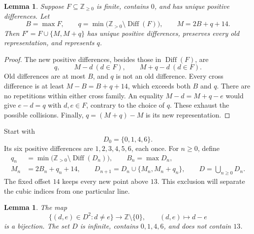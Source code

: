 \documentclass[11pt]{article}
\newtheorem{lemma}[theorem]{Lemma}
\theoremstyle{remark}
\newcommand{\Z}{\mathbb Z}
\DeclareMathOperator{\Diff}{Diff}
\begin{document}
\begin{lemma}\label{lem:extension}
Suppose $F\subseteq\Z_{\ge0}$ is finite, contains $0$, and has unique
positive differences. Let
\[
 B=\max F,\qquad
 q=\min\bigl(\Z_{>0}\setminus\Diff(F)\bigr),\qquad
 M=2B+q+14.
\]
Then $F'=F\cup\{M,M+q\}$ has unique positive differences, preserves
every old representation, and represents $q$.
\end{lemma}

\begin{proof}
The new positive differences, besides those in $\Diff(F)$, are
\[
 q,\qquad M-d\ (d\in F),\qquad M+q-d\ (d\in F).
\]
Old differences are at most $B$, and $q$ is not an old difference.
Every cross difference is at least
$M-B=B+q+14$, which exceeds both $B$ and $q$.
There are no repetitions within either cross family. An equality
$M-d=M+q-e$ would give $e-d=q$ with $d,e\in F$, contrary to the
choice of $q$. These exhaust the possible collisions. Finally,
$q=(M+q)-M$ is its new representation.
\end{proof}

Start with
\begin{equation}\label{eq:seed}
 D_0=\{0,1,4,6\}.
\end{equation}
Its six positive differences are $1,2,3,4,5,6$, each once.
For $n\ge0$, define
\begin{equation}\label{eq:recursion}
 \begin{split}
 q_n&=\min\bigl(\Z_{>0}\setminus\Diff(D_n)\bigr),\qquad
 B_n=\max D_n,\\
 M_n&=2B_n+q_n+14,\qquad
 D_{n+1}=D_n\cup\{M_n,M_n+q_n\},\qquad
 D=\bigcup_{n\ge0}D_n.
 \end{split}
\end{equation}
The fixed offset $14$ keeps every new point above $13$.
This exclusion will separate the cubic indices from one particular line.

\begin{lemma}\label{lem:perfect}
The map
\[
 \{(d,e)\in D^2:d\ne e\}\longrightarrow\Z\setminus\{0\},
 \qquad (d,e)\longmapsto d-e
\]
is a bijection. The set $D$ is infinite, contains $0,1,4,6$, and does
not contain $13$.
\end{lemma}
\end{document}
